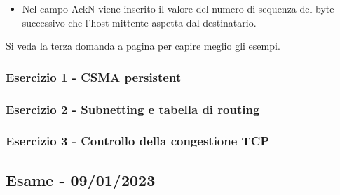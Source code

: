 \documentclass[a4paper]{article}
\begin{document}
\begin{enumerate}
\begin{itemize}
			\item Nel campo AckN viene inserito il valore del numero di sequenza del byte successivo che l'host mittente aspetta dal destinatario.
		\end{itemize}
		Si veda la terza domanda a pagina \pageref{TCP SN e AckN} per capire meglio gli esempi.
	\end{enumerate}
	
	\subsubsection{Esercizio 1 - CSMA persistent}
	
	\subsubsection{Esercizio 2 - Subnetting e tabella di routing}
	
	\subsubsection{Esercizio 3 - Controllo della congestione TCP}
	
	\newpage

	\subsection[\textbf{Esame - 09/01/2023}]{Esame - 09/01/2023}
	
\end{document}
